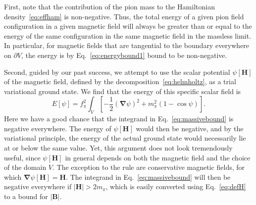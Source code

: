\documentclass[pdflatex,iicol,sn-mathphys-num]{sn-jnl}
\let\de=\partial
\newcommand{\vek}[1]{\bm{#1}}%
\newcommand{\grad}{\vek\nabla}%
\begin{document}
First, note that the contribution of the pion mass to the Hamiltonian density~\eqref{eq:effham} is non-negative. Thus, the total energy of a given pion field configuration in a given magnetic field will always be greater than or equal to the energy of the same configuration in the same magnetic field in the massless limit. In particular, for magnetic fields that are tangential to the boundary everywhere on $\de V$, the energy is by Eq.~\eqref{eq:energybound1} bound to be non-negative.

Second, guided by our past success, we attempt to use the scalar potential $\psi[\vek H]$ of the magnetic field, defined by the decomposition~\eqref{eq:helmholtz}, as a trial variational ground state. We find that the energy of this specific scalar field is
\begin{equation}
E[\psi]=f_\pi^2\int_V\left[-\frac12(\grad\psi)^2+m_\pi^2(1-\cos\psi)\right].
\label{eq:massivebound}
\end{equation}
Here we have a good chance that the integrand in Eq.~\eqref{eq:massivebound} is negative everywhere. The energy of $\psi[\vek H]$ would then be negative, and by the variational principle, the energy of the actual ground state would necessarily lie at or below the same value. Yet, this argument does not look tremendously useful, since $\psi[\vek H]$ in general depends on both the magnetic field and the choice of the domain $V$. The exception to the rule are conservative magnetic fields, for which $\grad\psi[\vek H]=\vek H$. The integrand in Eq.~\eqref{eq:massivebound} will then be negative everywhere if $|\vek H|>2m_\pi$, which is easily converted using Eq.~\eqref{eq:defH} to a bound for $|\vek B|$.
\end{document}
